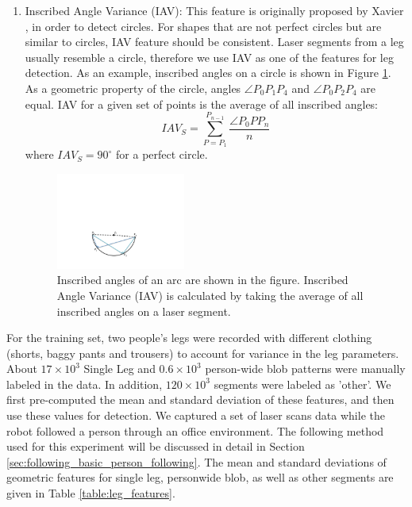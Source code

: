 \begin{enumerate}
\item Inscribed Angle Variance (IAV): This feature is originally proposed by Xavier \cite{xavier2005fast}, in order to detect circles. For shapes that are not perfect circles but are similar to circles, IAV feature should be consistent. Laser segments from a leg usually resemble a circle, therefore we use IAV as one of the features for leg detection. As an example, inscribed angles on a circle is shown in Figure \ref{fig:iav}. As a geometric property of the circle, angles $\angle P_0P_1P_4$ and $\angle P_0P_2P_4$ are equal. IAV for a given set of points is the average of all inscribed angles: 
\[
IAV_S = \sum_{P = P_1}^{P_{n-1}} \dfrac{\angle P_0PP_n}{n}
\]
where $IAV_S=90^{\circ}$ for a perfect circle.

\begin{figure}[ht!]
\centering
\includegraphics[width=0.4\textwidth]{pics/iav}
\caption{Inscribed angles of an arc are shown in the figure. Inscribed Angle Variance (IAV) is calculated by taking the average of all inscribed angles on a laser segment.}
\label{fig:iav}
\end{figure}

\end{enumerate}


For the training set, two people's legs were recorded with different clothing (shorts, baggy pants and trousers) to account for variance in the leg parameters. About $17\times 10^3$ Single Leg and $0.6\times 10^3$ person-wide blob patterns were manually labeled in the data. In addition, $120\times 10^3$ segments were labeled as 'other'. We first pre-computed the mean and standard deviation of these features, and then use these values for detection. We captured a set of laser scans data while the robot followed a person through an office environment. The following method used for this experiment will be discussed in detail in Section \ref{sec:following_basic_person_following}. The mean and standard deviations of geometric features for single leg, personwide blob, as well as other segments are given in Table \ref{table:leg_features}. 


